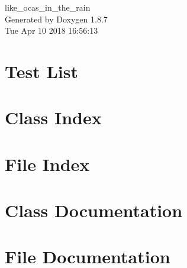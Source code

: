 \documentclass[twoside]{book}
\newcommand{\+}{\discretionary{\mbox{\scriptsize$\hookleftarrow$}}{}{}}
\newcommand{\clearemptydoublepage}{%
  \newpage{\pagestyle{empty}\cleardoublepage}%
}
\begin{document}
\hypersetup{pageanchor=false,
             bookmarks=true,
             bookmarksnumbered=true,
             pdfencoding=unicode
            }
\begin{titlepage}
\vspace*{7cm}
\begin{center}%
{\Large like\+\_\+ocas\+\_\+in\+\_\+the\+\_\+rain }\\
\vspace*{1cm}
{\large Generated by Doxygen 1.8.7}\\
\vspace*{0.5cm}
{\small Tue Apr 10 2018 16:56:13}\\
\end{center}
\end{titlepage}
\clearemptydoublepage
\tableofcontents
\clearemptydoublepage
{}
\hypersetup{pageanchor=true}

\chapter{Test List}
\label{test}
\hypertarget{test}{}

\chapter{Class Index}

\chapter{File Index}

\chapter{Class Documentation}











\chapter{File Documentation}












































\newpage
{}
{}
\printindex
\end{document}
